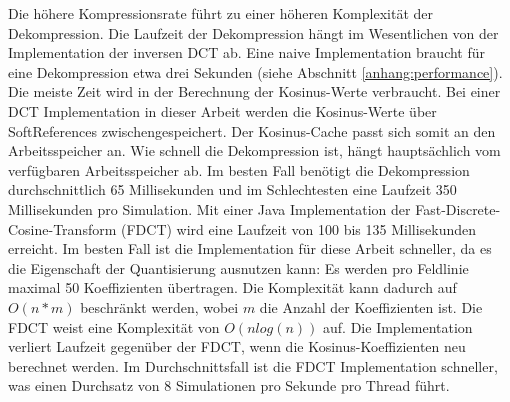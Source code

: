 Die höhere Kompressionsrate führt zu einer höheren Komplexität der Dekompression. Die Laufzeit der Dekompression hängt im Wesentlichen von der Implementation der inversen DCT ab. Eine naive Implementation braucht für eine Dekompression etwa drei Sekunden (siehe Abschnitt \ref{anhang:performance}). Die meiste Zeit wird in der Berechnung der Kosinus-Werte verbraucht. Bei einer DCT Implementation in dieser Arbeit werden die Kosinus-Werte über SoftReferences zwischengespeichert. Der Kosinus-Cache passt sich somit an den Arbeitsspeicher an. Wie schnell die Dekompression ist, hängt hauptsächlich vom verfügbaren Arbeitsspeicher ab. Im besten Fall benötigt die Dekompression durchschnittlich 65 Millisekunden und im Schlechtesten eine Laufzeit 350 Millisekunden pro Simulation. Mit einer Java Implementation der Fast-Discrete-Cosine-Transform (FDCT) wird eine Laufzeit von 100 bis 135 Millisekunden erreicht. Im besten Fall ist die Implementation für diese Arbeit schneller, da es die Eigenschaft der Quantisierung ausnutzen kann: Es werden pro Feldlinie maximal 50 Koeffizienten übertragen. Die Komplexität kann dadurch auf $O(n*m)$ beschränkt werden, wobei $m$ die Anzahl der Koeffizienten ist. Die FDCT weist eine Komplexität von $O(n log(n))$ auf. Die Implementation verliert Laufzeit gegenüber der FDCT, wenn die Kosinus-Koeffizienten neu berechnet werden. Im Durchschnittsfall ist die FDCT Implementation schneller, was einen Durchsatz von 8 Simulationen pro Sekunde pro Thread führt.